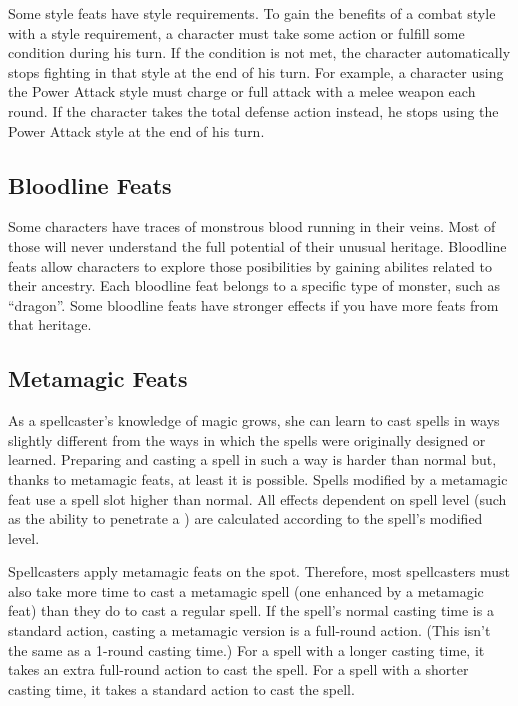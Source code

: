 Some style feats have style requirements. To gain the benefits of a combat style with a style requirement, a character must take some action or fulfill some condition during his turn. If the condition is not met, the character automatically stops fighting in that style at the end of his turn. For example, a character using the Power Attack style must charge or full attack with a melee weapon each round. If the character takes the total defense action instead, he stops using the Power Attack style at the end of his turn.

\subsection{Bloodline Feats}

Some characters have traces of monstrous blood running in their veins. Most of those will never understand the full potential of their unusual heritage. Bloodline feats allow characters to explore those posibilities by gaining abilites related to their ancestry. Each bloodline feat belongs to a specific type of monster, such as ``dragon''. Some bloodline feats have stronger effects if you have more feats from that heritage.

\subsection{Metamagic Feats}
As a spellcaster's knowledge of magic grows, she can learn to cast spells in ways slightly different from the ways in which the spells were originally designed or learned. Preparing and casting a spell in such a way is harder than normal but, thanks to metamagic feats, at least it is possible. Spells modified by a metamagic feat use a spell slot higher than normal. All effects dependent on spell level (such as the ability to penetrate a ) are calculated according to the spell's modified level.

 Spellcasters apply metamagic feats on the spot. Therefore, most spellcasters must also take more time to cast a metamagic spell (one enhanced by a metamagic feat) than they do to cast a regular spell. If the spell's normal casting time is a standard action, casting a metamagic version is a full-round action. (This isn't the same as a 1-round casting time.) For a spell with a longer casting time, it takes an extra full-round action to cast the spell. For a spell with a shorter casting time, it takes a standard action to cast the spell.

